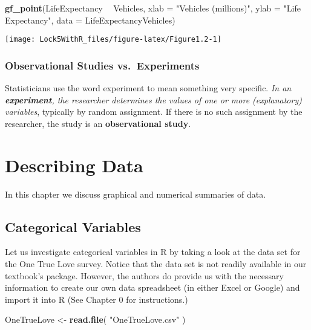 \documentclass[]{book}
\newenvironment{Shaded}{\begin{snugshade}}{\end{snugshade}}
\newcommand{\DataTypeTok}[1]{\textcolor[rgb]{0.13,0.29,0.53}{#1}}
\newcommand{\KeywordTok}[1]{\textcolor[rgb]{0.13,0.29,0.53}{\textbf{#1}}}
\newcommand{\NormalTok}[1]{#1}
\newcommand{\OperatorTok}[1]{\textcolor[rgb]{0.81,0.36,0.00}{\textbf{#1}}}
\newcommand{\StringTok}[1]{\textcolor[rgb]{0.31,0.60,0.02}{#1}}
\begin{document}
\begin{Shaded}
\begin{Highlighting}[]
\KeywordTok{gf_point}\NormalTok{(LifeExpectancy }\OperatorTok{~}\StringTok{ }\NormalTok{Vehicles, }\DataTypeTok{xlab =} \StringTok{"Vehicles (millions)"}\NormalTok{, }\DataTypeTok{ylab =} \StringTok{"Life Expectancy"}\NormalTok{, }
       \DataTypeTok{data =}\NormalTok{ LifeExpectancyVehicles)}
\end{Highlighting}
\end{Shaded}

\texttt{[image: Lock5WithR\_files/figure-latex/Figure1.2-1]}

\hypertarget{observational-studies-vs.-experiments}{%
\subsection{Observational Studies vs.~Experiments}\label{observational-studies-vs.-experiments}}

Statisticians use the word experiment to mean something very specific. \emph{In an \textbf{experiment}, the researcher determines the values of one or more (explanatory) variables}, typically by random assignment. If there is no such assignment by the researcher, the study is an \textbf{observational study}.

\hypertarget{describing-data}{%
\chapter{Describing Data}\label{describing-data}}

In this chapter we discuss graphical and numerical summaries of data.

\hypertarget{categorical-variables}{%
\section{Categorical Variables}\label{categorical-variables}}

Let us investigate categorical variables in R by taking a look at the data set for the One True Love survey. Notice that the data set is not readily available in our textbook's package. However, the authors do provide us with the necessary information to create our own data spreadsheet (in either Excel or Google) and import it into R (See Chapter 0 for instructions.)

\begin{Shaded}
\begin{Highlighting}[]
\NormalTok{OneTrueLove <-}\StringTok{ }\KeywordTok{read.file}\NormalTok{( }\StringTok{"OneTrueLove.csv"}\NormalTok{ )}
\end{Highlighting}
\end{Shaded}
\end{document}
